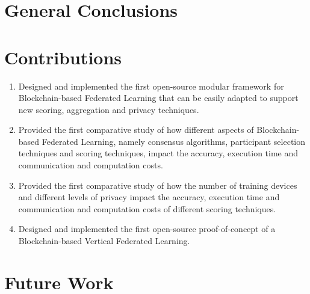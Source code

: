     
\section{General Conclusions}

\section{Contributions}

\begin{enumerate}
    \item Designed and implemented the first open-source modular framework for Blockchain-based Federated Learning that can be easily adapted to support new scoring, aggregation and privacy techniques.
    
    \item Provided the first comparative study of how different aspects of Blockchain-based Federated Learning, namely consensus algorithms, participant selection techniques and scoring techniques, impact the accuracy, execution time and communication and computation costs.
    
    \item Provided the first comparative study of how the number of training devices and different levels of privacy impact the accuracy, execution time and communication and computation costs of different scoring techniques.
    
    \item Designed and implemented the first open-source proof-of-concept of a Blockchain-based Vertical Federated Learning.
\end{enumerate}

\section{Future Work}
